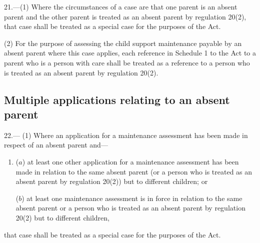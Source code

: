 \documentclass[a4paper]{article}
\begin{document}
21.—(1) Where the circumstances of a case are that one parent is an absent parent and the other parent is treated as an absent parent by regulation 20(2), that case shall be treated as a special case for the purposes of the Act.

(2) For the purpose of assessing the child support maintenance payable by an absent parent where this case applies, each reference in Schedule 1 to the Act to a parent who is a person with care shall be treated as a reference to a person who is treated as an absent parent by regulation 20(2).

\subsection[22. Multiple applications relating to an absent parent]{Multiple applications relating to an absent parent}

22.—%
%
%
(1) Where an application for a maintenance assessment has been made in respect of an absent parent and—
\begin{enumerate}\item[]
($a$) at least one other application for a maintenance assessment has been made in relation to the same absent parent (or a person who is treated as an absent parent by regulation 20(2)) but to different children; or

($b$) at least one maintenance assessment is in force in relation to the same absent parent or a person who is treated as an absent parent by regulation 20(2) but to different children,
\end{enumerate}
that case shall be treated as a special case for the purposes of the Act.

%
%
\end{document}
